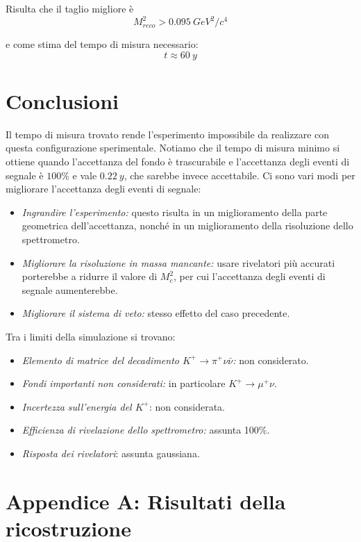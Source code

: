 \documentclass[8pt]{extarticle}
\begin{document}
Risulta che il taglio migliore è 
$$
M^2_{reco} > 0.095\ GeV^2/c^4
$$

e come stima del tempo di misura necessario:
$$
t \approx 60\ y
$$

\section{Conclusioni} \label{sec:conclusioni}

Il tempo di misura trovato rende l'esperimento impossibile da realizzare con questa configurazione sperimentale. Notiamo che il tempo di misura minimo si ottiene quando l'accettanza del fondo è trascurabile e l'accettanza degli eventi di segnale è $100\%$ e vale $0.22\ y$, che sarebbe invece accettabile. Ci sono vari modi per migliorare l'accettanza degli eventi di segnale:

\begin{itemize}
\item \textit{Ingrandire l'esperimento:} questo risulta in un miglioramento della parte geometrica dell'accettanza, nonché in un miglioramento della risoluzione dello spettrometro.
\item \textit{Migliorare la risoluzione in massa mancante:} usare rivelatori più accurati porterebbe a ridurre il valore di $M^2_c$, per cui l'accettanza degli eventi di segnale aumenterebbe.
\item \textit{Migliorare il sistema di veto:} stesso effetto del caso precedente.
\end{itemize}

Tra i limiti della simulazione si trovano:
\begin{itemize}
\item \textit{Elemento di matrice del decadimento $K^+ \rightarrow \pi^+ \nu \bar{\nu}$:} non considerato.
\item \textit{Fondi importanti non considerati:} in particolare $K^+ \rightarrow \mu^+ \nu$.
\item \textit{Incertezza sull'energia del $K^+$}: non considerata.
\item \textit{Efficienza di rivelazione dello spettrometro:} assunta 100\%.
\item \textit{Risposta dei rivelatori}: assunta gaussiana.
\end{itemize}

\section{Appendice A: Risultati della ricostruzione} \label{sec:grafici}
\end{document}
